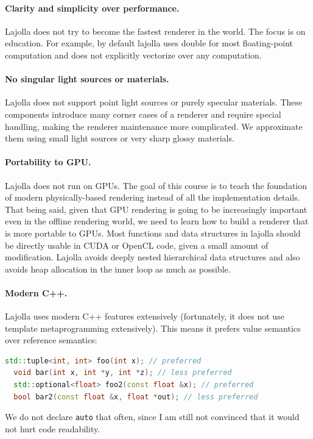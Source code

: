 \paragraph{Clarity and simplicity over performance.} Lajolla does not try to become the fastest renderer in the world. The focus is on education. For example, by default lajolla uses double for most floating-point computation and does not explicitly vectorize over any computation.

\paragraph{No singular light sources or materials.} Lajolla does not support point light sources or purely specular materials. These components introduce many corner cases of a renderer and require special handling, making the renderer maintenance more complicated. We approximate them using small light sources or very sharp glossy materials.

\paragraph{Portability to GPU.} Lajolla does not run on GPUs. The goal of this course is to teach the foundation of modern physically-based rendering instead of all the implementation details. That being said, given that GPU rendering is going to be increasingly important even in the offline rendering world, we need to learn how to build a renderer that is more portable to GPUs. Most functions and data structures in lajolla should be directly usable in CUDA or OpenCL code, given a small amount of modification. Lajolla avoids deeply nested hierarchical data structures and also avoids heap allocation in the inner loop as much as possible.

\paragraph{Modern C++.} Lajolla uses modern C++ features extensively (fortunately, it does not use template metaprogramming extensively). This means it prefers value semantics over reference semantics:
\begin{lstlisting}[language=C++]
  std::tuple<int, int> foo(int x); // preferred
  void bar(int x, int *y, int *z); // less preferred
  std::optional<float> foo2(const float &x); // preferred
  bool bar2(const float &x, float *out); // less preferred
\end{lstlisting}
We do not declare \lstinline{auto} that often, since I am still not convinced that it would not hurt code readability.

